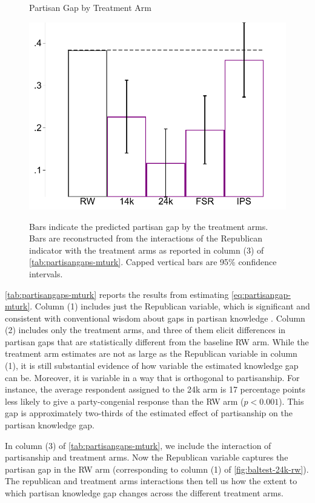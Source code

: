 \documentclass[12pt, letterpaper]{article}
\begin{document}
\begin{figure}[!t]
	\centering
	\caption{Partisan Gap by Treatment Arm}
	\includegraphics[scale=.6]{../figs/mturk-pgag-surveyarms.pdf}
	\label{fig:partisangaps-mturk-reg}
	\caption*{\footnotesize 
	Bars indicate the predicted partisan gap by the treatment arms. 
	Bars are reconstructed from the interactions of the Republican indicator with the treatment arms as reported in column (3) of \cref{tab:partisangaps-mturk}.
	Capped vertical bars are 95\% confidence intervals.
	}
\end{figure}
\cref{tab:partisangaps-mturk} reports the results from estimating \cref{eq:partisangap-mturk}. Column (1) includes just the Republican variable, which is significant and consistent with conventional wisdom about gaps in partisan knowledge \citep[e.g.][]{bullocketal_2015, pew2018disagree}.
Column (2) includes only the treatment arms, and three of them elicit differences in partisan gaps that are statistically different from the baseline RW arm. While the treatment arm estimates are not as large as the Republican variable in column (1), it is still substantial evidence of how variable the estimated knowledge gap can be.
Moreover, it is variable in a way that is orthogonal to partisanship. For instance, the average respondent assigned to the 24k arm is 17 percentage points less likely to give a party-congenial response than the RW arm ($p<0.001$). This gap is approximately two-thirds of the estimated effect of partisanship on the partisan knowledge gap.

In column (3) of \cref{tab:partisangaps-mturk}, we include the interaction of partisanship and treatment arms. Now the Republican variable captures the partisan gap in the RW arm (corresponding to column (1) of \cref{fig:baltest-24k-rw}). The republican and treatment arms interactions then tell us how the extent to which partisan knowledge gap changes across the different treatment arms. 
\end{document}
